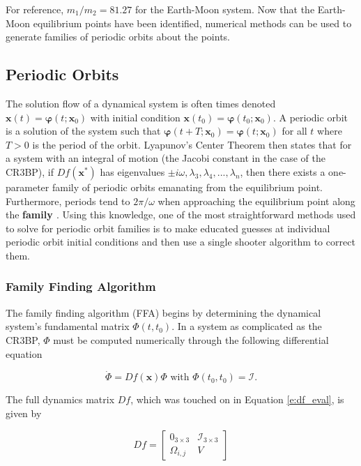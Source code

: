 \documentclass[11pt]{article} %
\begin{document}
\noindent
For reference, $m_1/m_2=81.27$ for the Earth-Moon system. Now that the Earth-Moon equilibrium points have been identified, numerical methods can be used to generate families of periodic orbits about the points.

\subsection{Periodic Orbits}
The solution flow of a dynamical system is often times denoted $\bm{x}\left(t\right)=\bm{\varphi}\left(t;\bm{x}_0\right)$ with initial condition $\bm{x}\left(t_0\right)=\bm{\varphi}\left(t_0;\bm{x}_0\right)$. A periodic orbit is a solution of the system such that $\bm{\varphi}\left(t+T;\bm{x}_0\right) = \bm{\varphi}\left(t;\bm{x}_0\right)$ for all $t$ where $T>0$ is the period of the orbit. Lyapunov's Center Theorem then states that for a system with an integral of motion (the Jacobi constant in the case of the CR3BP), if $Df\left(\bm{x}^*\right)$ has eigenvalues $\pm i\omega, \lambda_3, \lambda_4,...,\lambda_n$, then there exists a one-parameter family of periodic orbits emanating from the equilibrium point. Furthermore, periods tend to $2\pi/\omega$ when approaching the equilibrium point along the \textbf{family \cite{MeyerandHallBook}}. Using this knowledge, one of the most straightforward methods used to solve for periodic orbit families is to make educated guesses at individual periodic orbit initial conditions and then use a single shooter algorithm to correct them. 

\subsubsection{Family Finding Algorithm}
The family finding algorithm (FFA) begins by determining the dynamical system's fundamental matrix $\Phi\left(t,t_0\right)$. In a system as complicated as the CR3BP, $\Phi$ must be computed numerically through the following differential equation

\begin{equation}
	\dot{\Phi}=Df\left(\bm{x}\right)\Phi \text{ with } \Phi\left(t_0,t_0\right)=\mathcal{I}.
\end{equation}

\noindent
The full dynamics matrix $Df$, which was touched on in Equation \ref{e:df_eval}, is given by

\doublespace
\begin{equation}
	\label{e:df_full}
	Df = \begin{bmatrix}
		0_{3\times3} & \mathcal{I}_{3\times3} \\
		\Omega_{i,j} & V
	\end{bmatrix}
\end{equation}
\singlespace
\end{document}
